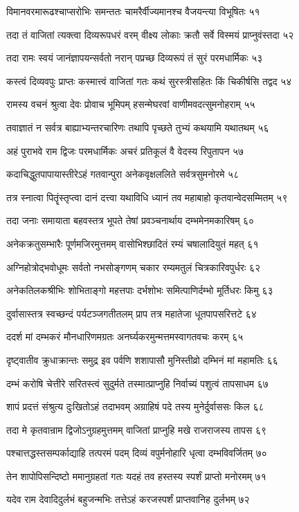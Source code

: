 विमानवरमारूढश्चाप्सरोभिः समन्ततः
चामरैर्वीज्यमानश्च वैजयन्त्या विभूषितः ५१

तदा तं वाजितां त्यक्त्वा दिव्यरूपधरं वरम्
वीक्ष्य लोकाः क्रतौ सर्वे विस्मयं प्राप्नुवंस्तदा ५२

तदा रामः स्वयं जानंज्ञापयन्सर्वतो नरान्
पप्रच्छ दिव्यरूपं तं सुरं परमधार्मिकः ५३

कस्त्वं दिव्यवपुः प्राप्तः कस्मात्त्वं वाजितां गतः
कथं सुरस्त्रीसहितः किं चिकीर्षसि तद्वद ५४

रामस्य वचनं श्रुत्वा देवः प्रोवाच भूमिपम्
हसन्मेघरवां वाणीमवदत्सुमनोहराम् ५५

तवाज्ञातं न सर्वत्र बाह्याभ्यन्तरचारिणः
तथापि पृच्छते तुभ्यं कथयामि यथातथम् ५६

अहं पुराभवे राम द्विजः परमधार्मिकः
अचरं प्रतिकूलं वै वेदस्य रिपुतापन ५७

कदाचिद्धुतपापायास्तीरेऽहं गतवान्पुरा
अनेकवृक्षललिते सर्वत्रसुमनोरमे ५८

तत्र स्नात्वा पितॄंस्तृप्त्वा दानं दत्त्वा यथाविधि
ध्यानं तव महाबाहो कृतवान्वेदसम्मितम् ५९

तदा जनाः समायाता बहवस्तत्र भूपते
तेषां प्रवञ्चनार्थाय दम्भमेनमकारिषम् ६०

अनेकक्रतुसम्भारैः पूर्णमजिरमुत्तमम्
वासोभिश्छादितं रम्यं चषालादियुतं महत् ६१

अग्निहोत्रोद्भवोधूमः सर्वतो नभसोङ्गणम्
चकार रम्यमतुलं चित्रकारिवपुर्धरः ६२

अनेकतिलकश्रीभिः शोभिताङ्गो महत्तपाः
दर्भशोभः समित्पाणिर्दम्भो मूर्तिधरः किमु ६३

दुर्वासास्तत्र स्वच्छन्दं पर्यटञ्जगतीतलम्
प्राप तत्र महातेजा धूतपापसरित्तटे ६४

ददर्श मां दम्भकरं मौनधारिणमग्रतः
अनर्घ्यकरमुन्मत्तमस्वागतवचः करम् ६५

दृष्ट्वातीव क्रुधाक्रान्तः समुद्र इव पर्वणि
शशापासौ मुनिस्तीव्रो दम्भिनं मां महामतिः ६६

दम्भं करोषि चेत्तीरे सरितस्त्वं सुदुर्मते
तस्मात्प्राप्नुहि निर्वाच्यं पशुत्वं तापसाधम ६७

शापं प्रदत्तं संश्रुत्य दुःखितोऽहं तदाभवम्
अग्राहिषं पदे तस्य मुनेर्दुर्वाससः किल ६८

तदा मे कृतवान्राम द्विजोऽनुग्रहमुत्तमम्
वाजितां प्राप्नुहि मखे राजराजस्य तापस ६९

पश्चात्तद्धस्तसम्पर्काद्याहि तत्परमं पदम्
दिव्यं वपुर्मनोहारि धृत्वा दम्भविवर्जितम् ७०

तेन शापोपिसन्दिष्टो ममानुग्रहतां गतः
यदहं तव हस्तस्य स्पर्शं प्राप्तो मनोरमम् ७१

यदेव राम देवादिदुर्लभं बहुजन्मभिः
तत्तेऽहं करजस्पर्शं प्राप्तवानिह दुर्लभम् ७२

